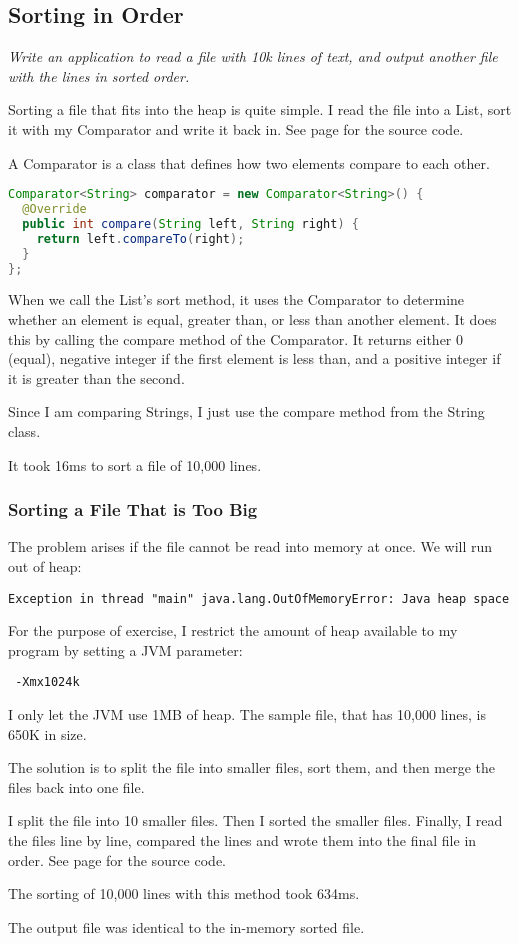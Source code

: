 \subsection{Sorting in Order}
\textit{Write an application to read a file with 10k lines of text, and output another file with the lines in sorted order.}

Sorting a file that fits into the heap is quite simple. I read the file into a List, sort it with my Comparator and write it back in. See page \pageref{App:AppendixF} for the source code.

A Comparator is a class that defines how two elements compare to each other.
\begin{lstlisting}[language=Java]
Comparator<String> comparator = new Comparator<String>() {
  @Override
  public int compare(String left, String right) {
    return left.compareTo(right);
  }
};
\end{lstlisting}

When we call the List's sort method, it uses the Comparator to determine whether an element is equal, greater than, or less than another element. It does this by calling the compare method of the Comparator. It returns either 0 (equal), negative integer if the first element is less than, and a positive integer if it is greater than the second.

Since I am comparing Strings, I just use the compare method from the String class.

It took 16ms to sort a file of 10,000 lines.

\subsubsection{Sorting a File That is Too Big}

The problem arises if the file cannot be read into memory at once. We will run out of heap:
\begin{lstlisting}
Exception in thread "main" java.lang.OutOfMemoryError: Java heap space
\end{lstlisting}

For the purpose of exercise, I restrict the amount of heap available to my program by setting a JVM parameter:
\begin{lstlisting}
 -Xmx1024k
\end{lstlisting}
I only let the JVM use 1MB of heap. The sample file, that has 10,000 lines, is 650K in size. 

The solution is to split the file into smaller files, sort them, and then merge the files back into one file.

I split the file into 10 smaller files. Then I sorted the smaller files. Finally, I read the files line by line, compared the lines and wrote them into the final file in order.  See page \pageref{App:AppendixG} for the source code.

The sorting of 10,000 lines with this method took 634ms.

The output file was identical to the in-memory sorted file.